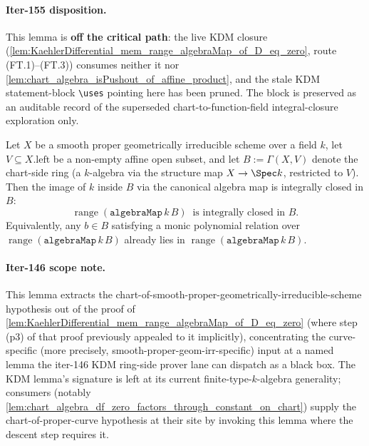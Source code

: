 \begin{lemma}
  \label{lem:KaehlerDifferential_constants_in_chart_of_proper_curve}
  \paragraph{Iter-155 disposition.} This lemma is \textbf{off the critical path}: the live KDM closure (\cref{lem:KaehlerDifferential_mem_range_algebraMap_of_D_eq_zero}, route (FT.1)--(FT.3)) consumes neither it nor \cref{lem:chart_algebra_isPushout_of_affine_product}, and the stale KDM statement-block \texttt{\textbackslash uses} pointing here has been pruned. The block is preserved as an auditable record of the superseded chart-to-function-field integral-closure exploration only.

  Let \(X\) be a smooth proper geometrically irreducible scheme over a field \(k\), let \(V \subseteq X.\mathrm{left}\) be a non-empty affine open subset, and let \(B := \Gamma(X, V)\) denote the chart-side ring (a \(k\)-algebra via the structure map \(X \to \Spec k\), restricted to \(V\)). Then the image of \(k\) inside \(B\) via the canonical algebra map is integrally closed in \(B\):
  \[
    \operatorname{range}(\mathtt{algebraMap}\,k\,B) \;\;\text{is integrally closed in } B.
  \]
  Equivalently, any \(b \in B\) satisfying a monic polynomial relation over \(\operatorname{range}(\mathtt{algebraMap}\,k\,B)\) already lies in \(\operatorname{range}(\mathtt{algebraMap}\,k\,B)\).

  \paragraph{Iter-146 scope note.} This lemma extracts the chart-of-smooth-proper-geometrically-irreducible-scheme hypothesis out of the proof of \cref{lem:KaehlerDifferential_mem_range_algebraMap_of_D_eq_zero} (where step (p3) of that proof previously appealed to it implicitly), concentrating the curve-specific (more precisely, smooth-proper-geom-irr-specific) input at a named lemma the iter-146 KDM ring-side prover lane can dispatch as a black box. The KDM lemma's signature is left at its current finite-type-\(k\)-algebra generality; consumers (notably \cref{lem:chart_algebra_df_zero_factors_through_constant_on_chart}) supply the chart-of-proper-curve hypothesis at their site by invoking this lemma where the descent step requires it.
\end{lemma}

